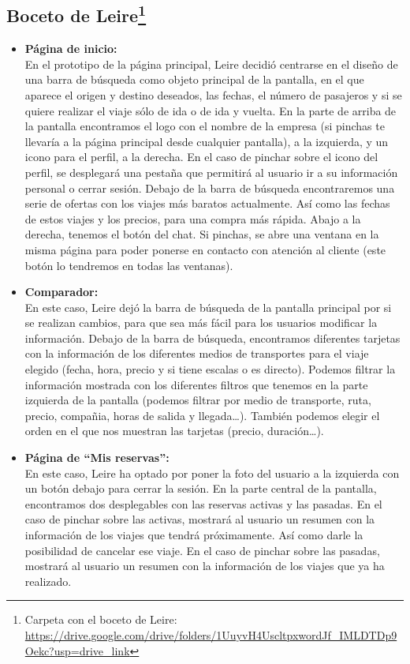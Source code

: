 \subsection[Boceto de Leire]{Boceto de Leire\footnote{Carpeta con el boceto de Leire: \url{https://drive.google.com/drive/folders/1UuyvH4UscltpxwordJf_IMLDTDp9Oekc?usp=drive_link}}}

\begin{itemize}
    \item\textbf{Página de inicio:} \\ En el prototipo de la página principal, Leire decidió centrarse en el diseño de una barra de búsqueda como objeto principal de la pantalla, en el que aparece el origen y destino deseados, las fechas, el número de pasajeros y si se quiere realizar el viaje sólo de ida o de ida y vuelta.
    En la parte de arriba de la pantalla encontramos el logo con el nombre de la empresa (si pinchas te llevaría a la página principal desde cualquier pantalla), a la izquierda, y un icono para el perfil, a la derecha.
    En el caso de pinchar sobre el icono del perfil, se desplegará una pestaña que permitirá al usuario ir a su información personal o cerrar sesión.
    Debajo de la barra de búsqueda encontraremos una serie de ofertas con los viajes más baratos actualmente. Así como las fechas de estos viajes y los precios, para una compra más rápida.
    Abajo a la derecha, tenemos el botón del chat. Si pinchas, se abre una ventana en la misma página para poder ponerse en contacto con atención al cliente (este botón lo tendremos en todas las ventanas).
    
    \item\textbf{Comparador:} \\ 

    En este caso, Leire dejó la barra de búsqueda de la pantalla principal por si se realizan cambios, para que sea más fácil para los usuarios modificar la información.
    Debajo de la barra de búsqueda, encontramos diferentes tarjetas con la información de los diferentes medios de transportes para el viaje elegido (fecha, hora, precio y si tiene escalas o es directo). Podemos filtrar la información mostrada con los diferentes filtros que tenemos en la parte izquierda de la pantalla (podemos filtrar por medio de transporte, ruta, precio, compañia, horas de salida y llegada…). También podemos elegir el orden en el que nos muestran las tarjetas (precio, duración…).
    
    \item\textbf{Página de ``Mis reservas'':} \\ En este caso, Leire ha optado por poner la foto del usuario a la izquierda con un botón debajo para cerrar la sesión.
    En la parte central de la pantalla, encontramos dos desplegables con las reservas activas y las pasadas.
    En el caso de pinchar sobre las activas, mostrará al usuario un resumen con la información de los viajes que tendrá próximamente. Así como darle la posibilidad de cancelar ese viaje.
    En el caso de pinchar sobre las pasadas, mostrará al usuario un resumen con la información de los viajes que ya ha realizado.
    

\end{itemize}
